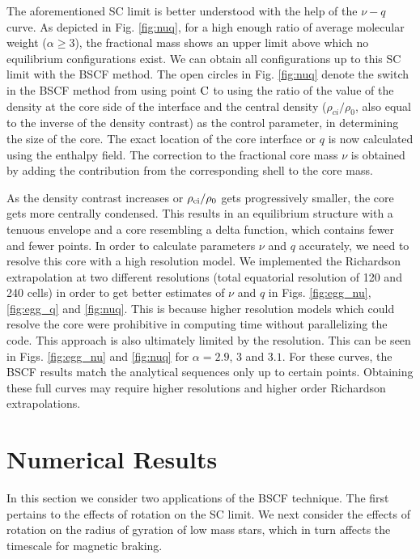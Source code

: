 \documentclass[a4paper,fleqn,usenatbib]{mnras}
\begin{document}
The aforementioned SC limit is better understood with the help of the $\nu-q$ curve. As depicted in Fig. \ref{fig:nuq}, for a high enough ratio of average molecular weight ($\alpha \geq 3$), the fractional mass shows an upper limit above which no equilibrium configurations exist. 
We can obtain all configurations up to this SC limit with the BSCF method. The open circles in Fig. \ref{fig:nuq} denote the switch in the BSCF method from using point $\rm C$ to using the ratio of the value of the density at the core side of the interface and the central density ($\rho_{ci}/ \rho_0$, also equal to the inverse of the density contrast) as the control parameter, in determining the size of the core. 
The exact location of the core interface or $q$ is now calculated using the enthalpy field. The correction to the fractional core mass $\nu$ is obtained by adding the contribution from the corresponding shell to the core mass.

As the density contrast increases or $\rho_{\rm ci}/\rho_{\rm 0}$ gets progressively smaller, the core gets more centrally condensed. This results in an equilibrium structure with a tenuous envelope and a core resembling a delta function, which contains fewer and fewer points. In order to calculate parameters $\nu $ and $q$ accurately, we need to resolve this core with a high resolution model.  
We implemented the Richardson extrapolation \citep{Richardson1911} at two different resolutions (total equatorial resolution of 120 and 240 cells) in order to get better estimates of $\nu$ and $q$ in Figs. \ref{fig:egg_nu},  \ref{fig:egg_q} and \ref{fig:nuq}. This is because higher resolution models which could resolve the core were prohibitive in computing time without parallelizing the code. This approach is also ultimately limited by the resolution.
This can be seen in Figs. \ref{fig:egg_nu} and \ref{fig:nuq} for $\alpha = 2.9$, $3$ and $ 3.1 $. For these curves, the BSCF results match the analytical sequences only up to certain points.
Obtaining these full curves 
may require higher resolutions and higher order Richardson extrapolations. 


\section{Numerical Results}
\label{NumericalResults}

In this section we consider two applications of the BSCF technique. 
The first pertains to the effects of rotation on the SC limit. We next consider  the effects of rotation on the radius of gyration of low mass stars, which in turn affects the timescale for magnetic braking.
\end{document}
